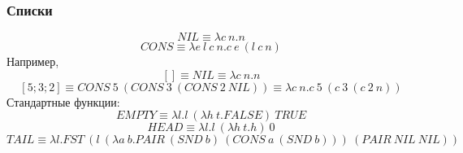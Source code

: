 \documentclass[xetex,mathserif,serif]{beamer}
\begin{document}
	\begin{frame}
		\frametitle{Списки}
		$$NIL \equiv \lambda c\ n.n$$
		$$CONS \equiv \lambda e\ l\ c\ n.c\ e\ (l\ c\ n)$$
		Например,
		$$[] \equiv NIL \equiv \lambda c\ n.n$$
		$$[5; 3; 2] \equiv CONS\ 5\ (CONS\ 3\ (CONS\ 2\ NIL)) \equiv \lambda c\ n.c\ 5\ (c\ 3\ (c\ 2\ n))$$
		Стандартные функции:
		$$EMPTY \equiv \lambda l.l\ (\lambda h\ t.FALSE)\ TRUE$$
		$$HEAD \equiv \lambda l.l\ (\lambda h\ t.h)\ 0$$
		$$TAIL \equiv \lambda l.FST\ (l\ (\lambda a\ b.PAIR\ (SND\ b)\ (CONS\ a\ (SND\ b)))\ (PAIR\ NIL\ NIL))$$
	\end{frame}
\end{document}
